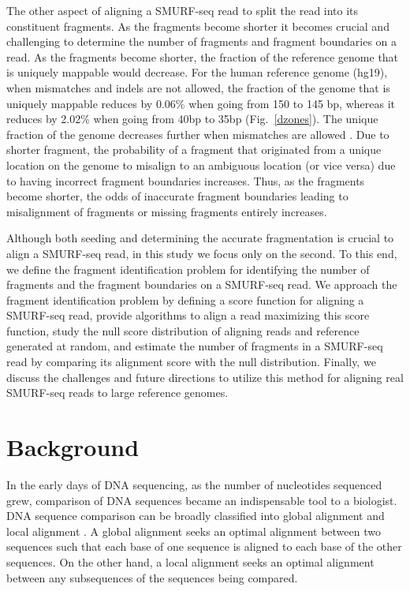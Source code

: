 The other aspect of aligning a SMURF-seq read to split the read into its
constituent fragments. As the fragments become shorter it becomes
crucial and challenging to determine the number of fragments and
fragment boundaries on a read.
%
As the fragments become shorter, the fraction of the reference genome
that is uniquely mappable would decrease. For the human reference genome
(hg19), when mismatches and indels are not allowed, the fraction of the
genome that is uniquely mappable reduces by 0.06\% when going from 150
to 145 bp, whereas it reduces by 2.02\% when going from 40bp to 35bp
(Fig.~\ref{dzones}).  The unique fraction of the genome decreases
further when mismatches are allowed \citep{derrien2012fast}.
Due to shorter fragment, the probability of a fragment that originated
from a unique location on the genome to misalign to an ambiguous
location (or vice versa) due to having incorrect fragment boundaries
increases.
%
Thus, as the fragments become shorter, the odds of inaccurate fragment
boundaries leading to misalignment of fragments or missing fragments
entirely increases.

Although both seeding and determining the accurate fragmentation is
crucial to align a SMURF-seq read, in this study we focus only on the
second.
%
To this end, we define the fragment identification problem for
identifying the number of fragments and the fragment boundaries on a
SMURF-seq read.  We approach the fragment identification problem by
defining a score function for aligning a SMURF-seq read, provide
algorithms to align a read maximizing this score function, study the
null score distribution of aligning reads and reference generated at
random, and estimate the number of fragments in a SMURF-seq read by
comparing its alignment score with the null distribution.
%
Finally, we discuss the challenges and future directions to utilize this
method for aligning real SMURF-seq reads to large reference genomes.



\section{Background}
\label{ch4_background}
In the early days of DNA sequencing, as the number of nucleotides
sequenced grew, comparison of DNA sequences became an indispensable tool
to a biologist.
%
DNA sequence comparison can be broadly classified into global alignment
\citep{needleman1970general} and local alignment
\citep{smith1981identification}. A global alignment seeks an optimal
alignment between two sequences such that each base of one sequence is
aligned to each base of the other sequences. On the other hand, a local
alignment seeks an optimal alignment between any subsequences of the
sequences being compared.

